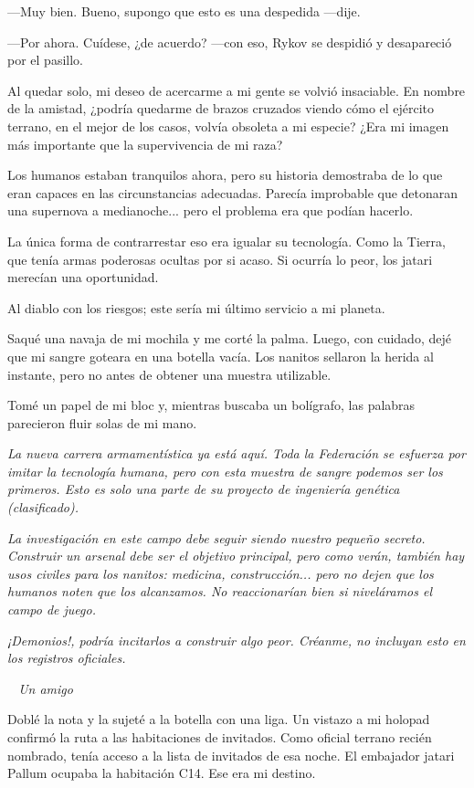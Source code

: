 —Muy bien. Bueno, supongo que esto es una despedida —dije.

—Por ahora. Cuídese, ¿de acuerdo? —con eso, Rykov se despidió y desapareció por el pasillo.

Al quedar solo, mi deseo de acercarme a mi gente se volvió insaciable. En nombre de la amistad, ¿podría quedarme de brazos cruzados viendo cómo el ejército terrano, en el mejor de los casos, volvía obsoleta a mi especie? ¿Era mi imagen más importante que la supervivencia de mi raza?

Los humanos estaban tranquilos ahora, pero su historia demostraba de lo que eran capaces en las circunstancias adecuadas. Parecía improbable que detonaran una supernova a medianoche... pero el problema era que podían hacerlo.

La única forma de contrarrestar eso era igualar su tecnología. Como la Tierra, que tenía armas poderosas ocultas por si acaso. Si ocurría lo peor, los jatari merecían una oportunidad.

Al diablo con los riesgos; este sería mi último servicio a mi planeta.

Saqué una navaja de mi mochila y me corté la palma. Luego, con cuidado, dejé que mi sangre goteara en una botella vacía. Los nanitos sellaron la herida al instante, pero no antes de obtener una muestra utilizable.

Tomé un papel de mi bloc y, mientras buscaba un bolígrafo, las palabras parecieron fluir solas de mi mano.

\textit{La nueva carrera armamentística ya está aquí. Toda la Federación se esfuerza por imitar la tecnología humana, pero con esta muestra de sangre podemos ser los primeros. Esto es solo una parte de su proyecto de ingeniería genética (clasificado).}

\textit{La investigación en este campo debe seguir siendo nuestro pequeño secreto. Construir un arsenal debe ser el objetivo principal, pero como verán, también hay usos civiles para los nanitos: medicina, construcción... pero no dejen que los humanos noten que los alcanzamos. No reaccionarían bien si niveláramos el campo de juego.}

\textit{¡Demonios!, podría incitarlos a construir algo peor. Créanme, no incluyan esto en los registros oficiales.}

\textit{~ Un amigo}

Doblé la nota y la sujeté a la botella con una liga. Un vistazo a mi holopad confirmó la ruta a las habitaciones de invitados. Como oficial terrano recién nombrado, tenía acceso a la lista de invitados de esa noche. El embajador jatari Pallum ocupaba la habitación C14. Ese era mi destino.

